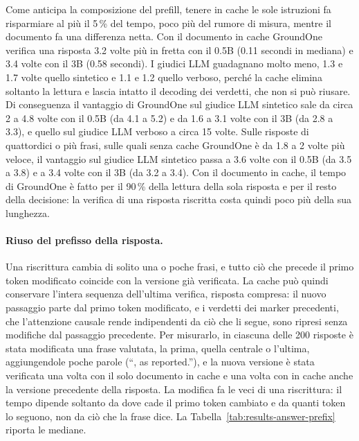Come anticipa la composizione del prefill, tenere in cache le sole istruzioni fa risparmiare al più il 5\,\% del tempo,
poco più del rumore di misura, mentre il documento fa una differenza netta. Con il documento in cache
GroundOne verifica una risposta 3.2 volte più in fretta con il 0.5B (0.11 secondi in mediana) e 3.4 volte con il 3B
(0.58 secondi). I giudici LLM guadagnano molto meno, 1.3 e 1.7 volte quello sintetico e 1.1 e 1.2 quello verboso,
perché la cache elimina soltanto la lettura e lascia intatto il decoding dei verdetti, che non si può riusare. Di
conseguenza il vantaggio di GroundOne sul giudice LLM sintetico sale da circa 2 a 4.8 volte con il 0.5B (da 4.1 a 5.2)
e da 1.6 a 3.1 volte con il 3B (da 2.8 a 3.3), e quello sul giudice LLM verboso a circa 15 volte. Sulle risposte di quattordici o più frasi, sulle quali senza cache GroundOne è da 1.8 a 2 volte più veloce, il vantaggio sul giudice LLM sintetico passa a 3.6 volte con il 0.5B (da 3.5 a 3.8) e a 3.4 volte con il 3B (da 3.2 a 3.4). Con il documento in cache,
il tempo di GroundOne è fatto per il 90\,\% della lettura della sola risposta e per il resto della decisione: la verifica
di una risposta riscritta costa quindi poco più della sua lunghezza.

\paragraph{Riuso del prefisso della risposta.} Una riscrittura cambia di solito una o poche frasi, e tutto ciò che
precede il primo token modificato coincide con la versione già verificata. La cache può quindi conservare l'intera
sequenza dell'ultima verifica, risposta compresa: il nuovo passaggio parte dal primo token modificato, e i verdetti dei
marker precedenti, che l'attenzione causale rende indipendenti da ciò che li segue, sono ripresi senza modifiche dal
passaggio precedente. Per misurarlo, in ciascuna delle 200 risposte è stata modificata una frase valutata, la prima,
quella centrale o l'ultima, aggiungendole poche parole (``, as reported.''), e la nuova versione è stata verificata una
volta con il solo documento in cache e una volta con in cache anche la versione precedente della risposta. La modifica fa
le veci di una riscrittura: il tempo dipende soltanto da dove cade il primo token cambiato e da quanti token lo seguono,
non da ciò che la frase dice. La Tabella~\ref{tab:results-answer-prefix} riporta le mediane.

